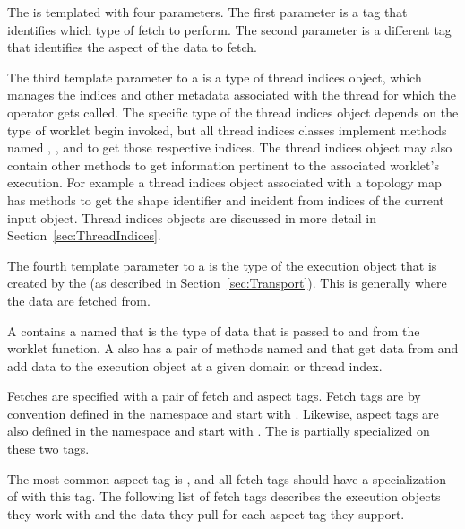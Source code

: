 The   is templated with four
parameters. The first parameter is a tag that identifies which type of
fetch to perform. The second parameter is a different tag that identifies
the aspect of the data to fetch.


The third template parameter to a   is a type of thread indices object, which manages the indices and other metadata associated with the thread for which the  operator gets called.
The specific type of the thread indices object depends on the type of worklet begin invoked, but all thread indices classes implement methods named , , and  to get those respective indices.
The thread indices object may also contain other methods to get information pertinent to the associated worklet's execution.
For example a thread indices object associated with a topology map has methods to get the shape identifier and incident from indices of the current input object.
Thread indices objects are discussed in more detail in Section~\ref{sec:ThreadIndices}.


The fourth template parameter to a   is the type of the execution object that is created by the  (as described in Section~\ref{sec:Transport}).
This is generally where the data are fetched from.

A  contains a  named
 that is the type of data that is passed to and from
the worklet function. A  also has a pair of methods
named  and  that get data from and add data
to the execution object at a given domain or thread index.


Fetches are specified with a pair of fetch and aspect tags. Fetch tags are by
convention defined in the \vtkmexecarg{} namespace and start with
. Likewise, aspect tags are also defined in the
\vtkmexecarg{} namespace and start with . The
  is partially specialized on these
two tags.

 The most common aspect tag is
, and all fetch tags should have a
specialization of  with this tag. The following list of
fetch tags describes the execution objects they work with and the data they
pull for each aspect tag they support.

